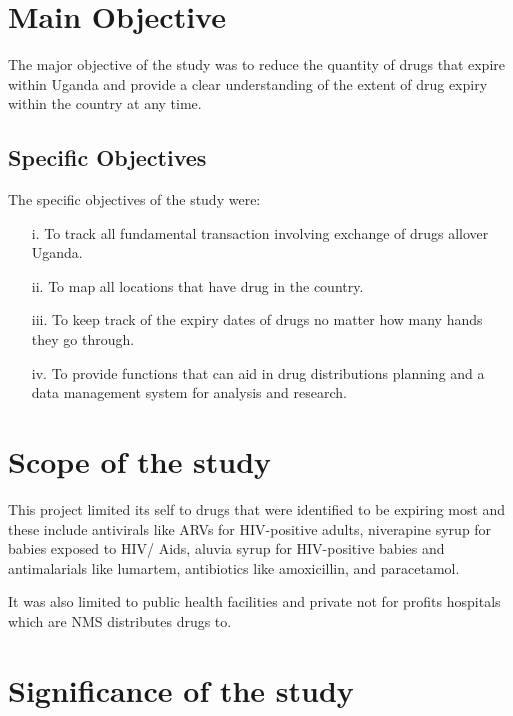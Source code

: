 \documentclass[12pt, a4paper]{report}
\begin{document}
\section{Main Objective}

The major objective of the study was to reduce the quantity of drugs that expire within Uganda and provide a clear understanding of the extent of drug expiry within the country at any time. 

\subsection{Specific Objectives}

The specific objectives of the study were: 

\begin{itemize}

\item[i.] To track all fundamental transaction involving exchange of drugs allover Uganda.

\item[ii.] To map all locations that have drug in the country.

\item[iii.] To keep track of the expiry dates of drugs no matter how many hands they go through.

\item[iv.] To provide functions that can aid in drug distributions planning and a data management system for analysis and research.

\end{itemize}


\section{Scope of the study}

This project limited its self to drugs that were identified to be expiring most and these include antivirals like ARVs for HIV-positive adults, niverapine syrup for babies exposed to HIV/ Aids, aluvia syrup for HIV-positive babies and antimalarials like lumartem, antibiotics like amoxicillin, and paracetamol.

It was also limited to public health facilities and private not for profits hospitals which are NMS distributes drugs to.
\section{Significance of the study}
\end{document}
